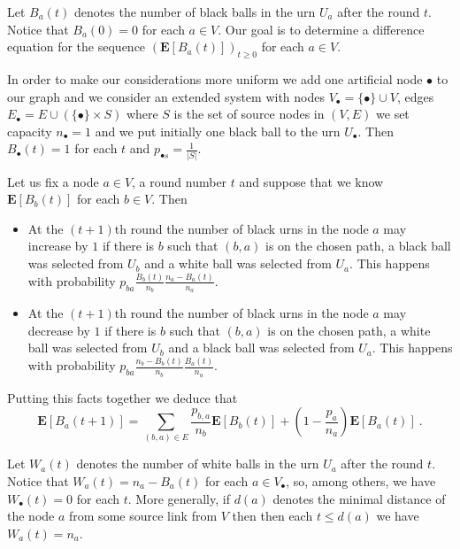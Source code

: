 \documentclass[submission]{dmtcs}
\newcommand{\E}[1]{\mathbf{E}\left[#1\right]}
\begin{document}
Let $B_a(t)$ denotes the number of black balls in the urn $U_a$ 
after the round $t$. Notice that $B_a(0) = 0$ for each $a\in V$.
Our goal is to determine a difference equation for 
the sequence $(\E{B_a(t)})_{t\geq 0}$ for each $a\in V$.

In order to make our considerations more uniform we add one 
artificial node $\bullet$ to our graph and we consider an extended system
with nodes $V_{\bullet}= \{\bullet\} \cup V$, 
edges $E_{\bullet} = E\cup (\{\bullet\}\times S)$ where $S$ is the set of 
source nodes in $(V,E)$
we set capacity
$n_\bullet = 1$ and we put initially one black ball to
the urn $U_\bullet$. Then $B_\bullet(t) = 1$ for each 
$t$ and $p_{\bullet s} = \frac{1}{|S|}$.  
  




Let us fix a node $a \in V$, a round  number $t$ 
and suppose that we know $\E{B_b(t)}$  for each $b\in V$.
Then
\begin{itemize}
\item
At the $(t+1)$th round the number of black urns in the node $a$ may increase by $1$
if there is $b$ such that $(b,a)$ is on the chosen path, 
a black ball was selected from $U_b$ and a white ball was selected from $U_a$.
This happens with probability $p_{ba} \frac{B_b(t)}{n_b} \frac{n_a - B_a(t)}{n_a}$.
\item
At the $(t+1)$th round the number of black urns in the node $a$ may decrease by $1$
if there is $b$ such that $(b,a)$ is on the chosen path, 
a white ball was selected from $U_b$ and a black ball was selected from $U_a$.
This happens with probability $p_{ba} \frac{n_b - B_b(t)}{n_b} \frac{B_a(t)}{n_a}$.
\end{itemize}
Putting this facts together we deduce that
\begin{equation}
\label{eq:generalRecurrence}
\E{B_a(t+1)} = 
\sum_{(b,a)\in E} \frac{p_{b,a}}{n_b} \E{B_b(t)} +
\left(1-\frac{p_a}{n_a}\right) \E{B_a(t)}~.
\end{equation}

Let $W_a(t)$ denotes the number of white balls in the urn $U_a$ 
after the round $t$. Notice that $W_a(t) = n_a - B_a(t)$ for each $a\in V_{\bullet}$, 
so,  among others, we have  $W_{\bullet}(t) = 0$ for each $t$. More generally,
if $d(a)$ denotes the minimal distance of the node $a$ from some 
source link from $V$ then then each $t\leq d(a)$ we have $W_a(t) = n_a$.
\end{document}
